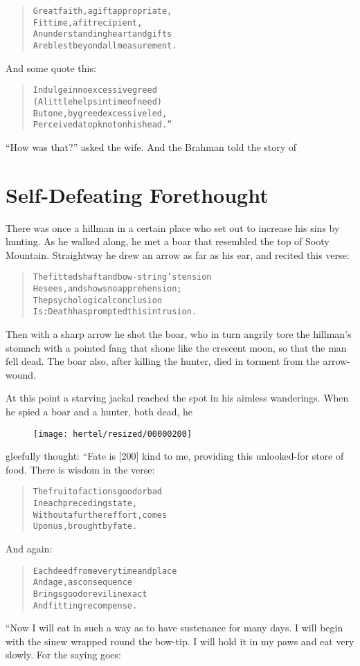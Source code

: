 \documentclass[article, twoside, 10pt]{memoir}
\renewenvironment{verbatim}{%
\begin{quote}%
\vskip -10pt%
\begin{alltt}\normalfont\small}{\end{alltt}%
\end{quote}%
\vskip -10pt
} %
\begin{document}
\begin{verbatim}
Great faith, a gift appropriate,
    Fit time, a fit recipient,
An understanding heart{\textemdash}and gifts
    Are blest beyond all measurement.
\end{verbatim}
And some quote this:

\begin{verbatim}
Indulge in no excessive greed
(A little helps in time of need)
But one, by greed excessive led,
Perceived a topknot on his head.”
\end{verbatim}
``How was that?'' asked the wife. And the Brahman told the story
of

\chapter{Self-Defeating Forethought}

There was once a hillman in a certain place who set out to increase
his sins by hunting. As he walked along, he met a boar that
resembled the top of Sooty Mountain. Straightway he drew an arrow
as far as his ear, and recited this verse:

\begin{verbatim}
The fitted shaft and bow-string's tension
He sees, and shows no apprehension;
The psychological conclusion
Is: Death has prompted this intrusion.
\end{verbatim}
Then with a sharp arrow he shot the boar, who in turn angrily tore
the hillman's stomach with a pointed fang that shone like the
crescent moon, so that the man fell dead. The boar also, after
killing the hunter, died in torment from the arrow-wound.

At this point a starving jackal reached the spot in his aimless
wanderings. When he spied a boar and a hunter, both dead, he
\begin{figure}[p]\texttt{[image: hertel/resized/00000200]}\end{figure}gleefully thought: “Fate is [200] kind to me, providing this
unlooked-for store of food. There is wisdom in the verse:

\begin{verbatim}
The fruit of actions good or bad
    In each preceding state,
Without a further effort, comes
    Upon us, brought by fate.
\end{verbatim}
And again:

\begin{verbatim}
Each deed from every time and place
    And age, as consequence
Brings good or evil in exact
    And fitting recompense.
\end{verbatim}
“Now I will eat in such a way as to have sustenance for many days.
I will begin with the sinew wrapped round the bow-tip. I will hold
it in my paws and eat very slowly. For the saying goes:
\end{document}
